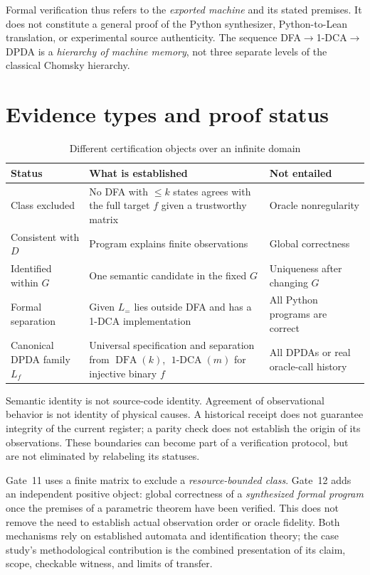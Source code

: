 \documentclass[11pt,a4paper]{article}
\newcommand{\DFA}{\operatorname{DFA}}
\newcommand{\oneDCA}{\operatorname{1\text{-}DCA}}
\begin{document}
Formal verification thus refers to the \emph{exported machine} and its stated premises. It does not constitute a general proof of the Python synthesizer, Python-to-Lean translation, or experimental source authenticity. The sequence DFA$\to$1-DCA$\to$DPDA is a \emph{hierarchy of machine memory}, not three separate levels of the classical Chomsky hierarchy.

\section{Evidence types and proof status}

\begin{table}[htbp]
\centering\small
\caption{Different certification objects over an infinite domain}\label{tab:status}
\renewcommand{\arraystretch}{1.12}
\begin{tabularx}{\linewidth}{@{}>{\raggedright\arraybackslash}p{2.55cm}>{\raggedright\arraybackslash}X>{\raggedright\arraybackslash}p{3.05cm}@{}}
\toprule
\textbf{Status} & \textbf{What is established} & \textbf{Not entailed}\\
\midrule
Class excluded & No DFA with $\le k$ states agrees with the full target $f$ given a trustworthy matrix & Oracle nonregularity\\
Consistent with $D$ & Program explains finite observations & Global correctness\\
Identified within $G$ & One semantic candidate in the fixed $G$ & Uniqueness after changing $G$\\
Formal separation & Given $L_=$ lies outside DFA and has a 1-DCA implementation & All Python programs are correct\\
Canonical DPDA family $L_f$ & Universal specification and separation from $\DFA(k)$, $\oneDCA(m)$ for injective binary $f$ & All DPDAs or real oracle-call history\\
\bottomrule
\end{tabularx}
\end{table}

Semantic identity is not source-code identity. Agreement of observational behavior is not identity of physical causes. A historical receipt does not guarantee integrity of the current register; a parity check does not establish the origin of its observations. These boundaries can become part of a verification protocol, but are not eliminated by relabeling its statuses.

Gate~11 uses a finite matrix to exclude a \emph{resource-bounded class}. Gate~12 adds an independent positive object: global correctness of a \emph{synthesized formal program} once the premises of a parametric theorem have been verified. This does not remove the need to establish actual observation order or oracle fidelity. Both mechanisms rely on established automata and identification theory; the case study's methodological contribution is the combined presentation of its claim, scope, checkable witness, and limits of transfer.
\end{document}
